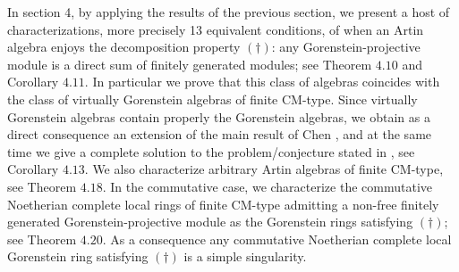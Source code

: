 \documentclass[oneside, a4paper,reqno]{amsart}
\numberwithin{equation}{section}
\theoremstyle{definition}
\begin{document}
In section 4, by applying the results of the previous section, we
present a host of characterizations, more precisely 13 equivalent
conditions, of when an Artin algebra enjoys the decomposition
property $\pmb{(\dagger)}$: any Gorenstein-projective module is a
direct sum of finitely generated modules; see Theorem $4.10$ and
Corollary $4.11$.  In particular we prove that this class of
algebras coincides with the class of virtually Gorenstein algebras
of finite CM-type. Since virtually Gorenstein algebras contain
properly the Gorenstein algebras, we obtain as a direct consequence
an extension of  the main result of Chen \cite{Chen}, and at the
same time we give a complete solution to the problem/conjecture
stated in \cite{Chen}, see Corollary $4.13$. We also characterize
arbitrary Artin algebras of finite CM-type, see Theorem $4.18$.
In the commutative case, we characterize the commutative Noetherian
complete local rings of finite CM-type admitting a non-free finitely
generated Gorenstein-projective module as the Gorenstein rings
satisfying $(\dagger)$; see Theorem $4.20$. As a consequence any
commutative Noetherian
 complete local Gorenstein ring satisfying $(\dagger)$ is a simple singularity.
\end{document}
